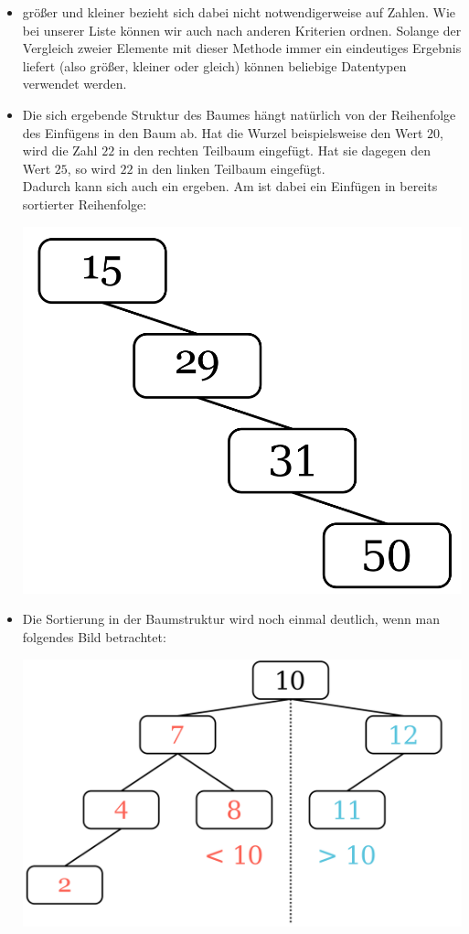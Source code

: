 \documentclass{article}
\begin{document}
\begin{itemize}
    \item größer und kleiner bezieht sich dabei nicht notwendigerweise auf Zahlen. Wie bei unserer Liste können wir auch nach anderen Kriterien ordnen. Solange der Vergleich zweier Elemente mit dieser Methode immer ein eindeutiges Ergebnis liefert (also größer, kleiner oder gleich) können beliebige Datentypen verwendet werden.
    \item Die sich ergebende Struktur des Baumes hängt natürlich von der Reihenfolge des Einfügens in den Baum ab. Hat die Wurzel beispielsweise den Wert $20$, wird die Zahl $22$ in den rechten Teilbaum eingefügt. Hat sie dagegen den Wert $25$, so wird $22$ in den linken Teilbaum eingefügt. \\
          Dadurch kann sich auch ein  ergeben. Am  ist dabei ein Einfügen in bereits sortierter Reihenfolge:
          \begin{center}
              \includegraphics[scale=0.15]{../../media/linear.png}
          \end{center}
    \item Die Sortierung in der Baumstruktur wird noch einmal deutlich, wenn man folgendes Bild betrachtet:
          \begin{center}
              \includegraphics[scale=0.15]{../../media/sortedTree.png}

\end{center}
\end{itemize}
\end{document}
